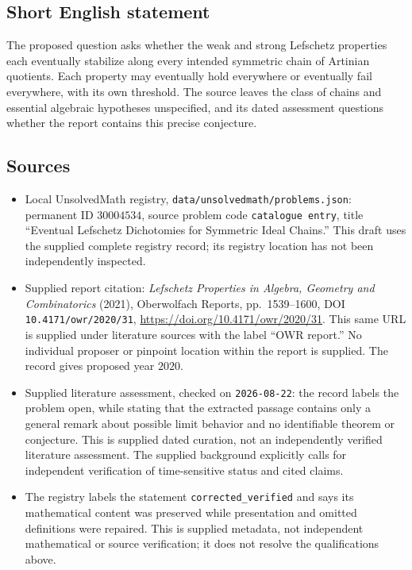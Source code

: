 \documentclass[11pt]{article}
\begin{document}
\subsection{Short English statement}
The proposed question asks whether the weak and strong Lefschetz properties each eventually stabilize along every intended symmetric chain of Artinian quotients. Each property may eventually hold everywhere or eventually fail everywhere, with its own threshold. The source leaves the class of chains and essential algebraic hypotheses unspecified, and its dated assessment questions whether the report contains this precise conjecture.
\subsection{Sources}
\begin{itemize}
\item Local UnsolvedMath registry, \texttt{data/unsolvedmath/problems.json}: permanent ID \(30004534\), source problem code \texttt{catalogue entry}, title ``Eventual Lefschetz Dichotomies for Symmetric Ideal Chains.'' This draft uses the supplied complete registry record; its registry location has not been independently inspected.
\item Supplied report citation: \emph{Lefschetz Properties in Algebra, Geometry and Combinatorics} (2021), Oberwolfach Reports, pp.\ 1539--1600, DOI \texttt{10.4171/owr/2020/31}, \url{https://doi.org/10.4171/owr/2020/31}. This same URL is supplied under literature sources with the label ``OWR report.'' No individual proposer or pinpoint location within the report is supplied. The record gives proposed year \(2020\).
\item Supplied literature assessment, checked on \texttt{2026-08-22}: the record labels the problem open, while stating that the extracted passage contains only a general remark about possible limit behavior and no identifiable theorem or conjecture. This is supplied dated curation, not an independently verified literature assessment. The supplied background explicitly calls for independent verification of time-sensitive status and cited claims.
\item The registry labels the statement \texttt{corrected\_verified} and says its mathematical content was preserved while presentation and omitted definitions were repaired. This is supplied metadata, not independent mathematical or source verification; it does not resolve the qualifications above.
\end{itemize}
\end{document}

